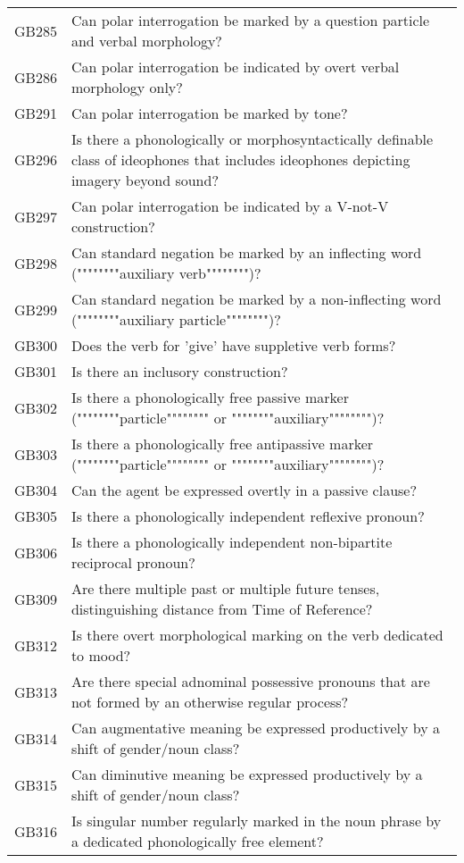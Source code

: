 \begin{longtable}{p{3cm}p{12cm}}
  GB285 & Can polar interrogation be marked by a question particle and verbal morphology? \\ 
  GB286 & Can polar interrogation be indicated by overt verbal morphology only? \\ 
  GB291 & Can polar interrogation be marked by tone? \\ 
  GB296 & Is there a phonologically or morphosyntactically definable class of ideophones that includes ideophones depicting imagery beyond sound? \\ 
  GB297 & Can polar interrogation be indicated by a V-not-V construction? \\ 
  GB298 & Can standard negation be marked by an inflecting word (""""""""auxiliary verb"""""""")? \\ 
  GB299 & Can standard negation be marked by a non-inflecting word (""""""""auxiliary particle"""""""")? \\ 
  GB300 & Does the verb for 'give' have suppletive verb forms? \\ 
  GB301 & Is there an inclusory construction? \\ 
  GB302 & Is there a phonologically free passive marker (""""""""particle"""""""" or """"""""auxiliary"""""""")? \\ 
  GB303 & Is there a phonologically free antipassive marker (""""""""particle"""""""" or """"""""auxiliary"""""""")? \\ 
  GB304 & Can the agent be expressed overtly in a passive clause? \\ 
  GB305 & Is there a phonologically independent reflexive pronoun? \\ 
  GB306 & Is there a phonologically independent non-bipartite reciprocal pronoun? \\ 
  GB309 & Are there multiple past or multiple future tenses, distinguishing distance from Time of Reference? \\ 
  GB312 & Is there overt morphological marking on the verb dedicated to mood? \\ 
  GB313 & Are there special adnominal possessive pronouns that are not formed by an otherwise regular process? \\ 
  GB314 & Can augmentative meaning be expressed productively by a shift of gender/noun class? \\ 
  GB315 & Can diminutive meaning be expressed productively by a shift of gender/noun class? \\ 
  GB316 & Is singular number regularly marked in the noun phrase by a dedicated phonologically free element? \\ 

\end{longtable}
